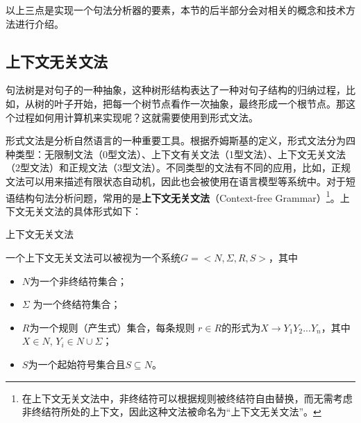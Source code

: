 \parinterval 以上三点是实现一个句法分析器的要素，本节的后半部分会对相关的概念和技术方法进行介绍。


\subsection{上下文无关文法}

\parinterval 句法树是对句子的一种抽象，这种树形结构表达了一种对句子结构的归纳过程，比如，从树的叶子开始，把每一个树节点看作一次抽象，最终形成一个根节点。那这个过程如何用计算机来实现呢？这就需要使用到形式文法。

\parinterval 形式文法是分析自然语言的一种重要工具。根据乔姆斯基的定义，形式文法分为四种类型：无限制文法（0型文法）、上下文有关文法（1型文法）、上下文无关文法（2型文法）和正规文法（3型文法）。不同类型的文法有不同的应用，比如，正规文法可以用来描述有限状态自动机，因此也会被使用在语言模型等系统中。对于短语结构句法分析问题，常用的是{\small\sffamily\bfseries{上下文无关文法}}（Context-free Grammar）\footnote{在上下文无关文法中，非终结符可以根据规则被终结符自由替换，而无需考虑非终结符所处的上下文，因此这种文法被命名为“上下文无关文法”。}。上下文无关文法的具体形式如下：

\vspace{0.5em}
\begin{definition} 上下文无关文法

一个上下文无关文法可以被视为一个系统$G=<N,\varSigma,R,S>$，其中

\begin{itemize}
\vspace{0.5em}
\item $N$为一个非终结符集合；
\vspace{0.5em}
\item $\varSigma$ 为一个终结符集合；
\vspace{0.5em}
\item $R$为一个规则（产生式）集合，每条规则 $r \in R$的形式为$X \to Y_1Y_2...Y_n$，其中$X \in N$, $Y_i \in N \cup \varSigma$；
\vspace{0.5em}
\item $S$为一个起始符号集合且$S \subseteq N$。
\vspace{0.5em}
\end{itemize}
\end{definition}

